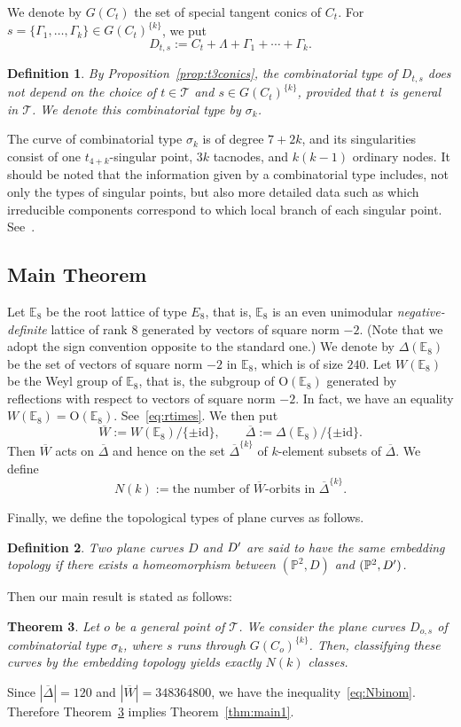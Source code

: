 \documentclass{math}
\theoremstyle{plain}
\newtheorem{theorem}{Theorem}[section]
\newtheorem{definition}[theorem]{Definition}
\newtheorem{remark}[theorem]{Remark}
\numberwithin{equation}{section}
\newcommand{\EE}{\mathord{\mathbb E}}
\newcommand{\PP}{\mathord{\mathbb  P}}
\newcommand{\TTT}{\mathord{\mathcal T}}
\newcommand{\sprime}{\sp{\prime}}
\newcommand{\OG}{\mathord{\mathrm{O}}}
\newcommand{\id}{\mathord{\mathrm{id}}}
\newcommand{\spset}[1]{^{\{#1\}}}
\newcommand{\mtan}[1]{t_{#1}}
\newcommand{\barW}{\overline{W}}
\newcommand{\barDelta}{\overline{\Delta}}
\begin{document}
%
We  denote by $G(C_t)$ the set of special tangent conics of $C_t$.
For $s=\{\Gamma_1, \dots, \Gamma_k\}\in G(C_t)\spset{k}$,
we put
\[
D_{t, s}:=C_t+\Lambda+\Gamma_1+\cdots+\Gamma_k.
\]
%
\begin{definition}\label{def:sigmak}
By Proposition~\ref{prop:t3conics},
the combinatorial type
of $D_{t,s}$ does not depend on the choice of 
$t\in \TTT$ and $s \in G(C_t)\spset{k}$,
provided that $t$ is general in $\TTT$.
We denote this combinatorial type 
by $\sigma_k$.
\end{definition}
%
The curve of combinatorial type $\sigma_k$  
is of degree $7+2k$,  and its singularities consist
of one $\mtan{4+k}$-singular point, $3k$ tacnodes, and $k(k-1)$ ordinary nodes.
It should be noted that the information given by 
a combinatorial type 
 includes,  not only the types of singular points, 
but also more detailed data such as which irreducible components 
correspond to which local branch of each singular point.
See~\cite[Remark 3]{TheSurvey}.
%
\subsection{Main Theorem}\label{subsec:Nk}
%
Let $\EE_8$ be the root lattice of type $E_8$,
that is, $\EE_8$ is an even unimodular \emph{negative-definite} lattice of rank $8$
generated by vectors of square norm $-2$.
(Note that we adopt the sign convention opposite to the standard one.)
We denote by $\Delta(\EE_8)$ be the set of vectors of square norm $-2$ in $\EE_8$,
which is of size $240$.
%
%
Let $W(\EE_8)$ be the Weyl group of $\EE_8$,
that is, the subgroup of $\OG(\EE_8)$ generated by reflections with respect to vectors
of square norm $-2$. 
In fact, we have an equality $W(\EE_8)=\OG(\EE_8)$.
See~\eqref{eq:rtimes}.
We then  put
\[
\barW:=W(\EE_8)/\{\pm \id\}, 
\qquad 
\barDelta:=\Delta(\EE_8)/\{\pm \id\}.
\]
Then $\barW$ acts on $\barDelta$ and hence on the set 
$\barDelta\spset{k}$ 
of $k$-element subsets of $\barDelta$.
We define 
\[
N(k):=\textrm{the number of $\barW$-orbits in  $\barDelta^{\{k\}}$.}
\]
%
\par
Finally, we define the topological types of plane curves as follows.
%
\begin{definition}\label{def:homeo}
Two plane curves $D$ and $D\sprime$ are said to 
have \emph{the same embedding topology}
if there exists a homeomorphism between 
$(\PP^2, D)$ and $(\PP^2, D\sprime)$.
\end{definition}
%
Then our main result is stated as follows:
%
\begin{theorem}\label{thm:main2}
Let $o$ be a general point of $\TTT$.
We consider the plane curves $D_{o, s}$ of combinatorial type $\sigma_k$,
where $s$ runs through $G(C_o)\spset{k}$.
Then, 
classifying these curves by the embedding topology yields  exactly $N(k)$ classes.
\end{theorem}
%
Since $|\barDelta|=120$ and $|\barW|=348364800$,
we have the inequality~\eqref{eq:Nbinom}.
Therefore Theorem~\ref{thm:main2} implies Theorem~\ref{thm:main1}.
%
%
%
%
\end{document}
